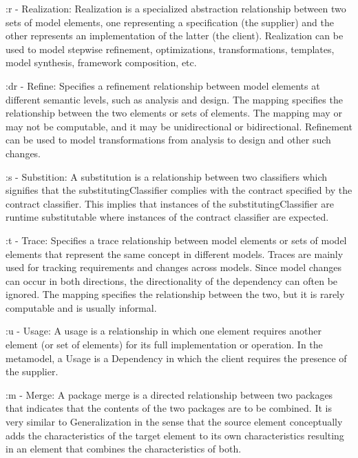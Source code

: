 \documentclass[10pt,a4paper,english]{article}
\begin{document}
\begin{flushleft}
:r - Realization: Realization is a specialized abstraction relationship between two sets of model elements, one representing a specification (the supplier) and the other represents an implementation of the latter (the client). Realization can be used to model stepwise refinement, optimizations, transformations, templates, model synthesis, framework composition, etc.
~\\ \medskip

:dr - Refine: Specifies a refinement relationship between model elements at different semantic levels, such as analysis and design. The mapping specifies the relationship between the two elements or sets of elements. The mapping may or may not be computable, and it may be unidirectional or bidirectional. Refinement can be used to model transformations from analysis to design and other such changes.
~\\ \medskip

:s - Substition: A substitution is a relationship between two classifiers which signifies that the substitutingClassifier complies with the contract specified by the contract classifier. This implies that instances of the substitutingClassifier are runtime substitutable where instances of the contract classifier are expected.
~\\ \medskip

:t - Trace: Specifies a trace relationship between model elements or sets of model elements that represent the same concept in different models. Traces are mainly used for tracking requirements and changes across models. Since model changes can occur in both directions, the directionality of the dependency can often be ignored. The mapping specifies the relationship between the two, but it is rarely computable and is usually informal.
~\\ \medskip

:u - Usage: A usage is a relationship in which one element requires another element (or set of elements) for its full implementation or operation. In the metamodel, a Usage is a Dependency in which the client requires the presence of the supplier.
~\\ \medskip

:m - Merge: A package merge is a directed relationship between two packages that indicates that the contents of the two packages are to be combined. It is very similar to Generalization in the sense that the source element conceptually adds the characteristics of the target element to its own characteristics resulting in an element that combines the characteristics of both.


\end{flushleft}
\end{document}
